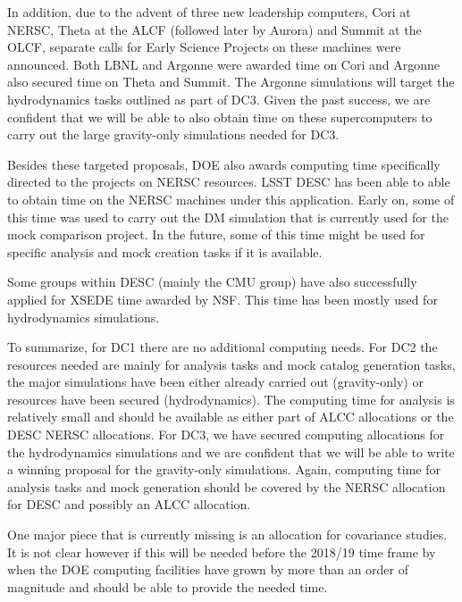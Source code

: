 In addition, due to the advent of three new leadership computers, Cori at NERSC, Theta at the ALCF (followed later by Aurora) and Summit at the OLCF, separate calls for Early Science Projects on these machines were announced. Both LBNL and Argonne were awarded time on Cori and Argonne also secured time on Theta and Summit. The Argonne simulations will target the hydrodynamics tasks outlined as part of DC3. Given the past success, we are confident that we will be able to also obtain time on these supercomputers to carry out the large gravity-only simulations needed for DC3.

Besides these targeted proposals, DOE also awards computing time specifically directed to the projects on NERSC resources. LSST DESC has been able to able to obtain time on the NERSC machines under this application. Early on, some of this time was used to carry out the DM simulation that is currently used for the mock comparison project. In the future, some of this time might be used for specific analysis and mock creation tasks if it is available.

Some groups within DESC (mainly the CMU group) have also successfully applied for XSEDE time awarded by NSF. This time has been mostly used for hydrodynamics simulations. 

To summarize, for DC1 there are no additional computing needs. For DC2 the resources needed are mainly for analysis tasks and mock catalog generation tasks, the major simulations have been either already carried out (gravity-only) or resources have been secured (hydrodynamics). The computing time for analysis is relatively small and should be available as either part of ALCC allocations or the DESC NERSC allocations. For DC3, we have secured computing allocations for the hydrodynamics simulations and we are confident that we will be able to write a winning proposal for the gravity-only simulations. Again, computing time for analysis tasks and mock generation should be covered by the NERSC allocation for DESC and possibly an ALCC allocation.

One major piece that is currently missing is an allocation for covariance studies. It is not clear however if this will be needed before the 2018/19 time frame by when the DOE computing facilities have grown by more than an order of magnitude and should be able to provide the needed time.
 

